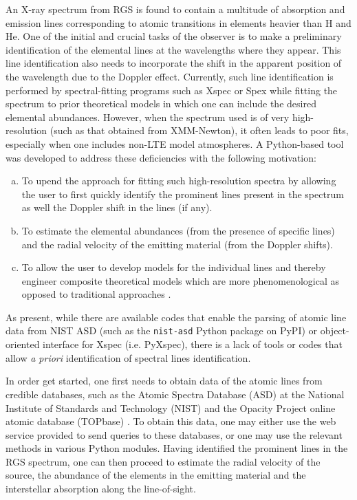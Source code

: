         An X-ray spectrum from RGS is found to contain a multitude of absorption and emission lines corresponding to atomic transitions in elements heavier than H and He. One of the initial and crucial tasks of the observer is to make a preliminary identification of the elemental lines at the wavelengths where they appear. This line identification also needs to incorporate the shift in the apparent position of the wavelength due to the Doppler effect. Currently, such line identification is performed by spectral-fitting programs such as Xspec or Spex while fitting the spectrum to prior theoretical models in which one can include the desired elemental abundances. However, when the spectrum used is of very high-resolution (such as that obtained from XMM-Newton), it often leads to poor fits, especially when one includes non-LTE model atmospheres. A Python-based tool was developed to address these deficiencies with the following motivation:
        \begin{enumerate}[a)]
            \item To upend the approach for fitting such high-resolution spectra by allowing the user to first quickly identify the prominent lines present in the spectrum as well the Doppler shift in the lines (if any).
            \item To estimate the elemental abundances (from the presence of specific lines) and the radial velocity of the emitting material (from the Doppler shifts).
            \item To allow the user to develop models for the individual lines and thereby engineer composite theoretical models which are more phenomenological as opposed to traditional approaches \cite{ness2020complications}.
        \end{enumerate}
        As present, while there are available codes that enable the parsing of atomic line data from NIST ASD (such as the \texttt{nist-asd} Python package on PyPI) or object-oriented interface for Xspec (i.e. PyXspec), there is a lack of tools or codes that allow \textit{a priori} identification of spectral lines identification.
        
        In order get started, one first needs to obtain data of the atomic lines from credible databases, such as the Atomic Spectra Database (ASD) at the National Institute of Standards and Technology (NIST) \cite{ralchenko2008nist} and the Opacity Project online atomic database (TOPbase) \cite{cunto1993topbase}. To obtain this data, one may either use the web service provided to send queries to these databases, or one may use the relevant methods in various Python modules. Having identified the prominent lines in the RGS spectrum, one can then proceed to estimate the radial velocity of the source, the abundance of the elements in the emitting material and the interstellar absorption along the line-of-sight.
        
